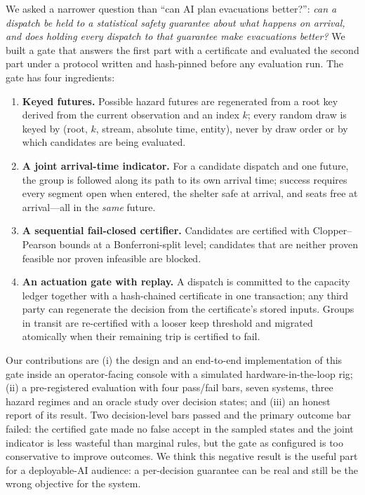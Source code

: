 \documentclass[letterpaper]{article}
\begin{document}
We asked a narrower question than ``can AI plan evacuations better?'': \emph{can a dispatch be held to a
statistical safety guarantee about what happens on arrival, and does holding every dispatch to that
guarantee make evacuations better?} We built a gate that answers the first part with a certificate and
evaluated the second part under a protocol written and hash-pinned before any evaluation run. The gate
has four ingredients:
\begin{enumerate}
\item \textbf{Keyed futures.} Possible hazard futures are regenerated from a root key derived from the
  current observation and an index $k$; every random draw is keyed by (root, $k$, stream, absolute time,
  entity), never by draw order or by which candidates are being evaluated.
\item \textbf{A joint arrival-time indicator.} For a candidate dispatch and one future, the group is
  followed along its path to its own arrival time; success requires every segment open when entered, the
  shelter safe at arrival, and seats free at arrival---all in the \emph{same} future.
\item \textbf{A sequential fail-closed certifier.} Candidates are certified with Clopper--Pearson bounds at a
  Bonferroni-split level; candidates that are neither proven feasible nor proven infeasible are
  blocked.
\item \textbf{An actuation gate with replay.} A dispatch is committed to the capacity ledger together with
  a hash-chained certificate in one transaction; any third party can regenerate the decision from the
  certificate's stored inputs. Groups in transit are re-certified with a looser keep threshold and
  migrated atomically when their remaining trip is certified to fail.
\end{enumerate}

Our contributions are (i) the design and an end-to-end implementation of this gate inside an
operator-facing console with a simulated hardware-in-the-loop rig; (ii) a pre-registered evaluation with
four pass/fail bars, seven systems, three hazard regimes and an oracle study over \nQfourStates{} decision
states; and (iii) an honest report of its result. Two decision-level bars passed and the primary
outcome bar failed: the certified gate made no false accept in the sampled states and the joint indicator
is less wasteful than marginal rules, but the gate as configured is too conservative to improve outcomes. We think this negative result
is the useful part for a deployable-AI audience: a per-decision guarantee can be real and still be the
wrong objective for the system.
\end{document}
